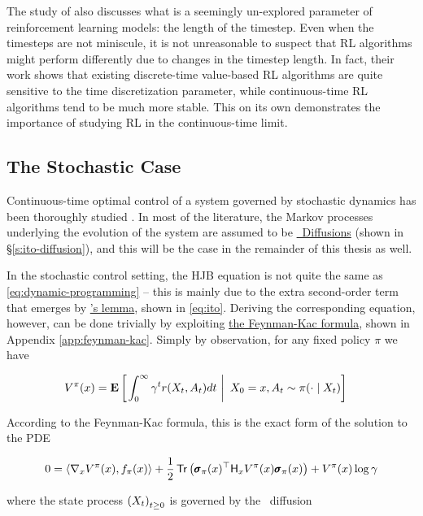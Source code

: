 The study of \citet{tallec2019making} also discusses what is a
seemingly un-explored parameter of reinforcement learning models: the
length of the timestep. Even when the timesteps are not miniscule, it
is not unreasonable to suspect that RL algorithms might perform
differently due to changes in the timestep length. In fact, their work
shows that existing discrete-time value-based RL algorithms are quite sensitive to
the time discretization parameter, while continuous-time RL algorithms
tend to be much more stable. This on its own demonstrates the
importance of studying RL in the continuous-time limit.

\subsection{The Stochastic Case}
Continuous-time optimal control of a system governed by stochastic
dynamics has been thoroughly studied \citep{fleming2006controlled}. In
most of the literature, the Markov processes underlying the evolution
of the system are assumed to be \hyperref[s:ito-diffusion]{\Ito\
Diffusions} (shown in \S\ref{s:ito-diffusion}), and this will be the case in the
remainder of this thesis as well.

In the stochastic control setting, the HJB equation is not quite the
same as \eqref{eq:dynamic-programming} -- this is mainly due to the
extra second-order term that emerges by \hyperref[app:ito]{\Ito's
lemma}, shown in \eqref{eq:ito}. Deriving the corresponding equation, however,
can be done trivially by exploiting \hyperref[app:feynman-kac]{the Feynman-Kac
formula}, shown in Appendix \ref{app:feynman-kac}. Simply by observation, for
any fixed policy $\pi$ we have

\begin{align*}
  V^\pi(x) &= \ConditionExpect{\int_0^\infty\gamma^tr(X_t,
             A_t)dt}{X_0=x, A_t\sim\pi(\cdot\mid X_t)}
\end{align*}

According to the Feynman-Kac formula, this is the exact form of the
solution to the PDE

\begin{equation}
  \label{eq:hjb:stochastic}
  0 = \langle\nabla_xV^\pi(x), f_\pi(x)\rangle +
  \frac{1}{2}\trace\left(\quadraticform{\pmb{\sigma}_\pi(x)}{\hessian{x}V^\pi(x)}\right)
  + V^\pi(x)\log\gamma
\end{equation}

where the state process $\indexedabove{t}{X}$ is governed by the \Ito\
diffusion

